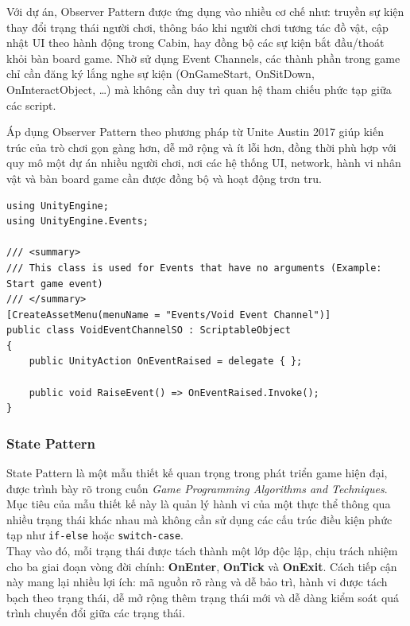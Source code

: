 Với dự án, Observer Pattern được ứng dụng vào nhiều cơ chế như: truyền sự kiện thay đổi trạng thái người chơi, thông báo khi người chơi tương tác đồ vật, cập nhật UI theo hành động trong Cabin, hay đồng bộ các sự kiện bắt đầu/thoát khỏi bàn board game. Nhờ sử dụng Event Channels, các thành phần trong game chỉ cần đăng ký lắng nghe sự kiện (OnGameStart, OnSitDown, OnInteractObject, \ldots) mà không cần duy trì quan hệ tham chiếu phức tạp giữa các script.

Áp dụng Observer Pattern theo phương pháp từ Unite Austin 2017 giúp kiến trúc của trò chơi gọn gàng hơn, dễ mở rộng và ít lỗi hơn, đồng thời phù hợp với quy mô một dự án nhiều người chơi, nơi các hệ thống UI, network, hành vi nhân vật và bàn board game cần được đồng bộ và hoạt động trơn tru.

\begin{lstlisting}[style=csharpstyle, caption={Event Channel trong dự án}]
using UnityEngine;
using UnityEngine.Events;

/// <summary>
/// This class is used for Events that have no arguments (Example: Start game event)
/// </summary>
[CreateAssetMenu(menuName = "Events/Void Event Channel")]
public class VoidEventChannelSO : ScriptableObject
{
    public UnityAction OnEventRaised = delegate { };

    public void RaiseEvent() => OnEventRaised.Invoke();
}
\end{lstlisting}


\subsubsection{State Pattern}

State Pattern là một mẫu thiết kế quan trọng trong phát triển game hiện đại, được trình bày rõ trong cuốn \textit{Game Programming Algorithms and Techniques}\cite{madhav2013}. Mục tiêu của mẫu thiết kế này là quản lý hành vi của một thực thể thông qua nhiều trạng thái khác nhau mà không cần sử dụng các cấu trúc điều kiện phức tạp như \texttt{if-else} hoặc \texttt{switch-case}. \\

Thay vào đó, mỗi trạng thái được tách thành một lớp độc lập, chịu trách nhiệm cho ba giai đoạn vòng đời chính: \textbf{OnEnter}, \textbf{OnTick} và \textbf{OnExit}. Cách tiếp cận này mang lại nhiều lợi ích: mã nguồn rõ ràng và dễ bảo trì, hành vi được tách bạch theo trạng thái, dễ mở rộng thêm trạng thái mới và dễ dàng kiểm soát quá trình chuyển đổi giữa các trạng thái.\\

